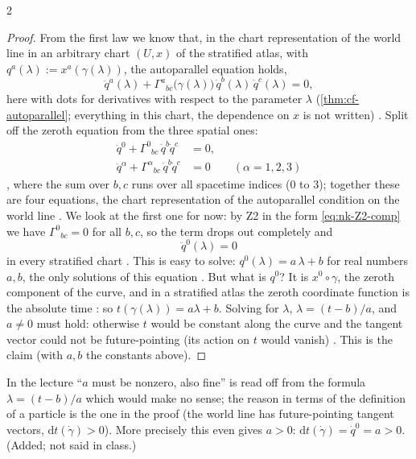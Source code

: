 \begin{paracol}{2}
\begin{proof}
From the first law we know that, in the chart representation of the world line in an arbitrary chart $(U,x)$ of the stratified atlas, with $q^a(\lambda):=x^a(\gamma(\lambda))$, the autoparallel equation holds,
\[
  \ddot q^a(\lambda)+\Gamma^a{}_{bc}\bigl(\gamma(\lambda)\bigr)\,\dot q^b(\lambda)\,\dot q^c(\lambda)=0 ,
\]
here with dots for derivatives with respect to the parameter $\lambda$ (\cref{thm:cf-autoparallel}; everything in this chart, the dependence on $x$ is not written) . Split off the zeroth equation from the three spatial ones:
\begin{align*}
  \ddot q^0+\Gamma^0{}_{bc}\,\dot q^b\dot q^c&=0 ,\\
  \ddot q^\alpha+\Gamma^\alpha{}_{bc}\,\dot q^b\dot q^c&=0\qquad(\alpha=1,2,3)
\end{align*}
, where the sum over $b,c$ runs over all spacetime indices ($0$ to $3$); together these are four equations, the chart representation of the autoparallel
condition on the world line . We look at the first one for now: by Z2 in the form \eqref{eq:nk-Z2-comp} we have $\Gamma^0{}_{bc}=0$ for all $b,c$, so the term drops out completely and
\[
  \ddot q^0(\lambda)=0
\]
in every stratified chart . This is easy to solve: $q^0(\lambda)=a\,\lambda+b$ for real numbers $a,b$, the only solutions of this equation . But what is $q^0$? It is
$x^0\circ\gamma$, the zeroth component of the curve, and in a stratified atlas the zeroth coordinate function is the absolute time : so $t(\gamma(\lambda))=a\lambda+b$. Solving for $\lambda$,
$\lambda=(t-b)/a$, and $a\ne0$ must hold: otherwise $t$ would be constant along the curve and the tangent vector could not be future-pointing (its action on $t$ would vanish) . This is the claim (with $a,b$ the constants above). \qedhere
\end{proof}
\begin{coursenote}
In the lecture ``$a$ must be nonzero, also fine'' is read off from the formula $\lambda=(t-b)/a$ which would make no sense; the reason in terms of the definition of a particle is the one in the proof
(the world line has future-pointing tangent vectors, $\mathrm dt(\dot\gamma)>0$). More precisely this even gives $a>0$: $\mathrm dt(\dot\gamma)=\dot q^0=a>0$. (Added; not said in class.)
\end{coursenote}


\end{paracol}
